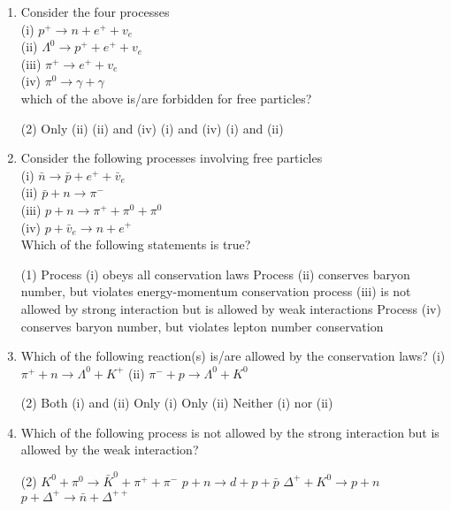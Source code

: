 \begin{enumerate}
	\item  Consider the four processes\\
	(i) $p^{+} \rightarrow n+e^{+}+v_e$\\
	(ii) $\Lambda^0 \rightarrow p^{+}+e^{+}+v_e$\\
	(iii) $\pi^{+} \rightarrow e^{+}+v_e$\\
	(iv) $\pi^0 \rightarrow \gamma+\gamma$\\
	which of the above is/are forbidden for free particles?
	{}
	 \begin{tasks}(2)
		\task[\textbf{a.}]Only (ii)
		\task[\textbf{b.}](ii) and (iv)
		\task[\textbf{c.}](i) and (iv)
		\task[\textbf{d.}]  (i) and (ii)
	\end{tasks}

	\item  Consider the following processes involving free particles\\
	(i) $\bar{n} \rightarrow \bar{p}+e^{+}+\bar{v}_e$\\
	(ii) $\bar{p}+n \rightarrow \pi^{-}$\\
	(iii) $p+n \rightarrow \pi^{+}+\pi^0+\pi^0$\\
	(iv) $p+\bar{v}_e \rightarrow n+e^{+}$\\
	Which of the following statements is true?
	{}
	 \begin{tasks}(1)
		\task[\textbf{a.}] Process (i) obeys all conservation laws
		\task[\textbf{b.}]Process (ii) conserves baryon number, but violates energy-momentum conservation
		\task[\textbf{c.}] process (iii) is not allowed by strong interaction but is allowed by weak interactions
		\task[\textbf{d.}] Process (iv) conserves baryon number, but violates lepton number conservation
	\end{tasks}
	
	\item Which of the following reaction(s) is/are allowed by the conservation laws?
	(i) $\pi^{+}+n \rightarrow \Lambda^0+K^{+}$
	(ii) $\pi^{-}+p \rightarrow \Lambda^0+K^0$
	{}
	 \begin{tasks}(2)
		\task[\textbf{a.}]Both (i) and (ii)
		\task[\textbf{b.}] Only (i)
		\task[\textbf{c.}] Only (ii)
		\task[\textbf{d.}]  Neither (i) nor (ii)
	\end{tasks}

	\item  Which of the following process is not allowed by the strong interaction but is allowed by the weak interaction?
	{}
	 \begin{tasks}(2)
		\task[\textbf{a.}]$K^0+\pi^0 \rightarrow \bar{K}^0+\pi^{+}+\pi^{-}$
		\task[\textbf{b.}]$p+n \rightarrow d+p+\bar{p}$
		\task[\textbf{c.}]$\Delta^{+}+K^0 \rightarrow p+n$
		\task[\textbf{d.}] $p+\Delta^{+} \rightarrow \bar{n}+\Delta^{++}$
	\end{tasks}


\end{enumerate}
